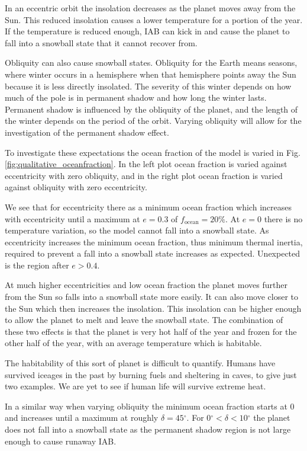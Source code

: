 \documentclass[12pt, onecolumn]{revtex4-2}    %
\newcommand{\degrees}{\ensuremath{^{\circ}}}
\begin{document}
In an eccentric orbit the insolation decreases as the planet moves away from the Sun.
This reduced insolation causes a lower temperature for a portion of the year.
If the temperature is reduced enough, IAB can kick in and cause the planet to fall into a snowball state that it cannot recover from.

Obliquity can also cause snowball states.
Obliquity for the Earth means seasons, where winter occurs in a hemisphere when that hemisphere points away the Sun because it is less directly insolated.
The severity of this winter depends on how much of the pole is in permanent shadow and how long the winter lasts.
Permanent shadow is influenced by the obliquity of the planet, and the length of the winter depends on the period of the orbit.
Varying obliquity will allow for the investigation of the permanent shadow effect.

To investigate these expectations the ocean fraction of the model is varied in Fig. \ref{fig:qualitative_oceanfraction}.
In the left plot ocean fraction is varied against eccentricity with zero obliquity, and in the right plot ocean fraction is varied against obliquity with zero eccentricity.

We see that for eccentricity there as a minimum ocean fraction which increases with eccentricity until a maximum at $e=0.3$ of $f_\text{ocean} = 20\%$.
At $e=0$ there is no temperature variation, so the model cannot fall into a snowball state.
As eccentricity increases the minimum ocean fraction, thus minimum thermal inertia, required to prevent a fall into a snowball state increases as expected.
Unexpected is the region after $e > 0.4$.

At much higher eccentricities and low ocean fraction the planet moves further from the Sun so falls into a snowball state more easily.
It can also move closer to the Sun which then increases the insolation.
This insolation can be higher enough to allow the planet to melt and leave the snowball state.
The combination of these two effects is that the planet is very hot half of the year and frozen for the other half of the year, with an average temperature which is habitable.

The habitability of this sort of planet is difficult to quantify.
Humans have survived iceages in the past by burning fuels and sheltering in caves, to give just two examples.
We are yet to see if human life will survive extreme heat.

In a similar way when varying obliquity the minimum ocean fraction starts at 0 and increases until a maximum at roughly $\delta = 45\degrees$.
For $0\degrees < \delta < 10\degrees$ the planet does not fall into a snowball state as the permanent shadow region is not large enough to cause runaway IAB.
\end{document}
